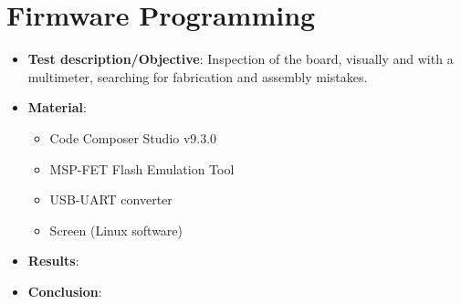 %

\section{Firmware Programming}

\begin{itemize}
    \item \textbf{Test description/Objective}: Inspection of the board, visually and with a multimeter, searching for fabrication and assembly mistakes.
    \item \textbf{Material}:
        \begin{itemize}
            \item Code Composer Studio v9.3.0
            \item MSP-FET Flash Emulation Tool
            \item USB-UART converter
            \item Screen (Linux software)
        \end{itemize}
    \item \textbf{Results}: %
    \item \textbf{Conclusion}: %
\end{itemize}


